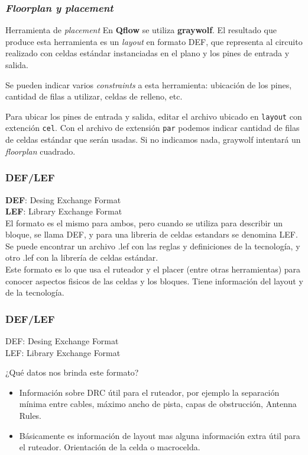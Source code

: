 \documentclass{beamer}
\begin{document}
\begin{frame}[fragile]
  \frametitle{\emph{Floorplan y placement}}
  \begin{exampleblock}{Herramienta de \emph{placement}}
    En \textbf{Qflow} se utiliza \textbf{graywolf}. El resultado que produce esta herramienta es un \emph{layout} en formato DEF, que representa al circuito realizado con celdas estándar instanciadas en el plano y los pines de entrada y salida.

    Se pueden indicar varios \emph{constraints} a esta herramienta: ubicación de los pines, cantidad de filas a utilizar, celdas de relleno, etc.

    Para ubicar los pines de entrada y salida, editar el archivo ubicado en \verb.layout. con extención \verb.cel..  Con el archivo de extensión \verb.par. podemos indicar cantidad de filas de celdas estándar que serán usadas. Si no indicamos nada, graywolf intentará un \emph{floorplan} cuadrado.

  \end{exampleblock}
\end{frame}


\begin{frame}
\frametitle{DEF/LEF}

\textbf{DEF}: Desing Exchange Format \\
\textbf{LEF}: Library Exchange Format \\


El formato es el mismo para ambos, pero cuando se utiliza para describir un bloque, se llama DEF, y para una libreria de celdas estandars se denomina LEF.
Se puede encontrar un archivo .lef con las reglas y definiciones de la tecnolog\'ia, y otro .lef con la librer\'ia de celdas est\'andar.\\
Este formato es lo que usa el ruteador y el placer (entre otras herramientas) para conocer aspectos fisicos de las celdas y los bloques. Tiene informaci\'on del layout y de la tecnolog\'ia. 



\end{frame}


\begin{frame}
\frametitle{DEF/LEF}
DEF: Desing Exchange Format \\
LEF: Library Exchange Format \\

\begin{center}¿Qué datos nos brinda este formato?
\end{center}
    \begin{itemize}
    \item Informaci\'on sobre DRC \'util para el ruteador, por ejemplo la separación mínima entre cables, m\'aximo ancho de pista, capas de obstrucción, Antenna Rules.
    \item B\'asicamente es informaci\'on de layout mas alguna informaci\'on extra \'util para el ruteador. Orientaci\'on de la celda o macrocelda.  
    \end{itemize}
\end{frame}
\end{document}

